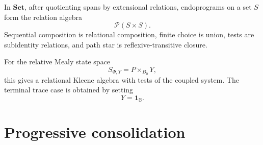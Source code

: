 \begin{example}
\label{ex:relative-relational-kat}
In \(\mathbf{Set}\), after quotienting spans by extensional relations,
endoprograms on a set \(S\) form the relation algebra
\[
\mathcal P(S\times S).
\]
Sequential composition is relational composition, finite choice is union,
tests are subidentity relations, and path star is reflexive-transitive closure.

For the relative Mealy state space
\[
S_{\Phi,Y}=P\times_{B_0}Y,
\]
this gives a relational Kleene algebra with tests of the coupled system. The
terminal trace case is obtained by setting
\[
Y=\mathbf 1_{\mathbb B}.
\]
\end{example}

\section{Progressive consolidation}
\label{sec:relative-progressive-consolidation}

